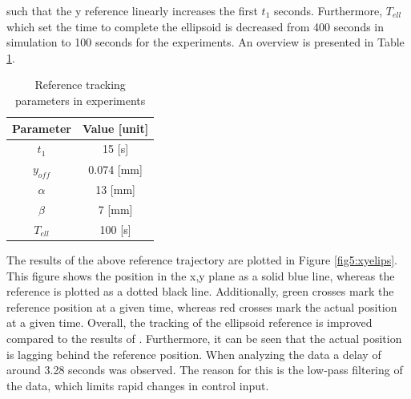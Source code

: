 such that the y reference linearly increases the first $t_1$ seconds. Furthermore, $T_{ell}$ which set the time to complete the ellipsoid is decreased from 400 seconds in simulation to 100 seconds for the experiments. An overview is presented in Table \ref{tab5:refparams}. 


\begin{table}[H]
    \centering
    \caption{Reference tracking parameters in experiments}
    \begin{tabular}{|c|c|} \hline
   \textbf{Parameter}  & \textbf{Value [unit]} \\ \hline
    $t_1$ &   15 [s]  \\ 
    $y_{off}$ & 0.074 [mm] \\
    $\alpha$ & 13 [mm] \\
    $\beta$ & 7 [mm] \\
    $T_{ell}$ & 100 [s] \\ \hline
\end{tabular}
    \label{tab5:refparams}
\end{table}

The results of the above reference trajectory are plotted in Figure \ref{fig5:xyelips}. This figure shows the position in the x,y plane as a solid blue line, whereas the reference is plotted as a dotted black line. Additionally, green crosses mark the reference position at a given time, whereas red crosses mark the actual position at a given time. Overall, the tracking of the ellipsoid reference is improved compared to the results of \cite{berkers}. Furthermore, it can be seen that the actual position is lagging behind the reference position. When analyzing the data a delay of around 3.28 seconds was observed. The reason for this is the low-pass filtering of the data, which limits rapid changes in control input. 


